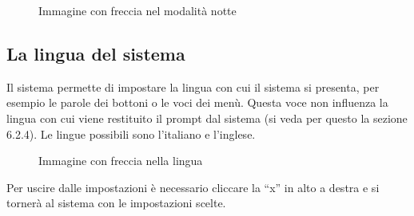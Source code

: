 \begin{figure}[H]
    \centering
    \caption{Immagine con freccia nel modalità notte}
  \end{figure}

\subsection{La lingua del sistema}

Il sistema permette di impostare la lingua con cui il sistema si presenta, per esempio le parole dei bottoni o le voci dei menù. Questa voce non influenza la lingua con cui viene restituito il prompt dal sistema (si veda per questo la sezione 6.2.4). Le lingue possibili sono l'italiano e l'inglese.

\begin{figure}[H]
    \centering
    \caption{Immagine con freccia nella lingua}
  \end{figure}

Per uscire dalle impostazioni è necessario cliccare la ``x'' in alto a destra e si tornerà al sistema con le impostazioni scelte.
